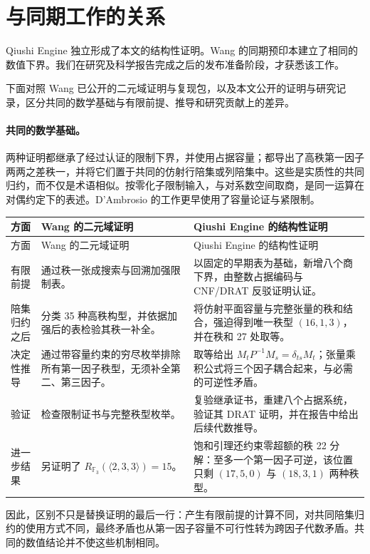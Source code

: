 \section{与同期工作的关系}\label{app:comparison}

Qiushi Engine 独立形成了本文的结构性证明。Wang 的同期预印本建立了相同的数值下界\cite{wang2026twentyone}。我们在研究及科学报告完成之后的发布准备阶段，才获悉该工作。

下面对照 Wang 已公开的二元域证明与复现包，以及本文公开的证明与研究记录，区分共同的数学基础与有限前提、推导和研究贡献上的差异。

\paragraph{共同的数学基础。}
两种证明都继承了经过认证的限制下界，并使用占据容量；都导出了高秩第一因子两两之差秩一，并将它们置于共同的仿射行陪集或列陪集中。这些是实质性的共同归约，而不仅是术语相似。按零化子限制输入，与对系数空间取商，是同一运算在对偶约定下的表述。D'Ambrosio 的工作更早使用了容量论证与紧限制\cite{dambrosio2026}。

\begin{longtable}{@{}L{2.1cm}L{5.7cm}L{6.4cm}@{}}
\toprule
方面&Wang 的二元域证明&Qiushi Engine 的结构性证明\\
\midrule
\endfirsthead
\toprule 方面&Wang 的二元域证明&Qiushi Engine 的结构性证明\\\midrule
\endhead
\bottomrule\endfoot
有限前提
&通过秩一张成搜索与回溯加强限制表。
&以固定的早期表为基础，新增八个商下界，由整数占据编码与 CNF/DRAT 反驳证明认证。\\
陪集归约之后
&分类 35 种高秩构型，并依据加强后的表检验其秩一补全。
&将仿射平面容量与完整张量的秩和结合，强迫得到唯一秩型 $(16,1,3)$，并在秩和 27 处取等。\\
决定性推导
&通过带容量约束的穷尽枚举排除所有第一因子秩型，无须补全第二、第三因子。
&取等给出 $M_tP^{-1}M_s=\delta_{ts}M_t$；张量乘积公式将三个因子耦合起来，与必需的可逆性矛盾。\\
验证
&检查限制证书与完整秩型枚举。
&复验继承证书，重建八个占据系统，验证其 DRAT 证明，并在报告中给出后续代数推导。\\
进一步结果
&另证明了 $R_{\mathbb F_3}(\langle2,3,3\rangle)=15$。
&饱和引理还约束零超额的秩 22 分解：至多一个第一因子可逆，该位置只剩 $(17,5,0)$ 与 $(18,3,1)$ 两种秩型。\\
\end{longtable}

因此，区别不只是替换证明的最后一行：产生有限前提的计算不同，对共同陪集归约的使用方式不同，最终矛盾也从第一因子容量不可行性转为跨因子代数矛盾。共同的数值结论并不使这些机制相同。


